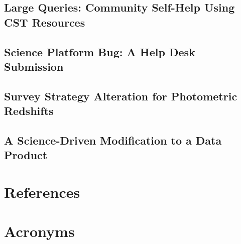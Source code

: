 \documentclass[DM,lsstdraft,authoryear,toc]{lsstdoc}
\begin{document}
\clearpage
\subsection{Large Queries: Community Self-Help Using CST Resources}


\clearpage
\subsection{Science Platform Bug: A Help Desk Submission}


\clearpage
\subsection{Survey Strategy Alteration for Photometric Redshifts}


\clearpage
\subsection{A Science-Driven Modification to a Data Product}


\appendix
\section{References} \label{sec:bib}
\renewcommand{\refname}{} %


\section{Acronyms} \label{sec:acronyms}

\end{document}
